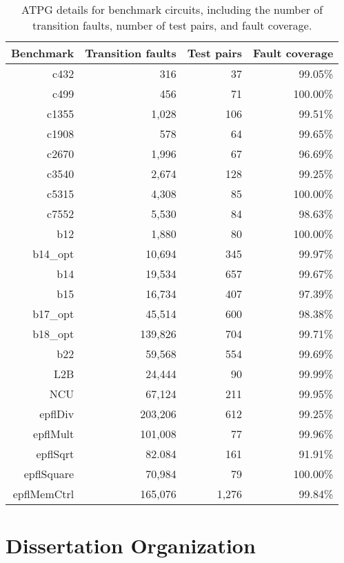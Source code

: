 \begin{table}[hbtp]
\center
\begin{tabular*}{0.8\columnwidth}{@{\extracolsep{\fill}}rrrr}
\toprule
Benchmark   &Transition faults     &Test pairs &Fault coverage\\
\midrule
c432        &316        &37         &99.05\%\\
c499        &456        &71         &100.00\%\\
c1355       &1,028      &106        &99.51\%\\
c1908       &578        &64         &99.65\%\\
c2670       &1,996      &67         &96.69\%\\
c3540       &2,674      &128        &99.25\%\\
c5315       &4,308      &85         &100.00\%\\
c7552       &5,530      &84         &98.63\%\\
\midrule
b12         &1,880      &80         &100.00\%\\
b14\_opt    &10,694     &345        &99.97\%\\
b14         &19,534     &657        &99.67\%\\
b15         &16,734     &407        &97.39\%\\
b17\_opt    &45,514     &600        &98.38\%\\
b18\_opt    &139,826    &704        &99.71\%\\
b22         &59,568     &554        &99.69\%\\
\midrule
L2B         &24,444     &90         &99.99\%\\
NCU         &67,124     &211        &99.95\%\\
\midrule
epflDiv     &203,206    &612        &99.25\%\\
epflMult    &101,008    &77         &99.96\%\\
epflSqrt    &82.084     &161        &91.91\%\\
epflSquare  &70,984     &79         &100.00\%\\
epflMemCtrl &165,076    &1,276      &99.84\%\\
\bottomrule
\end{tabular*}
\caption{ATPG details for benchmark circuits, including the number of transition faults, number of test pairs, and fault coverage.}
\label{table:intro_circuit_details}
\end{table}


\section{Dissertation Organization}
\label{sec:intro_dissertation_organization}


